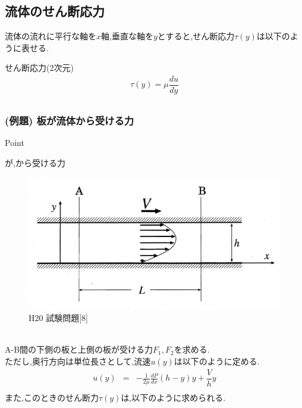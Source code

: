 \documentclass[a4paper]{jsarticle}
\begin{document}
\subsection{流体のせん断応力}
流体の流れに平行な軸を$x$軸,垂直な軸を$y$とすると,せん断応力$\tau\left(y\right)$は以下のように表せる.
\begin{itembox}[l]{せん断応力(2次元)}
    \begin{eqnarray*}
        \tau\left(y\right)=\mu\dfrac{du}{dy}\\
    \end{eqnarray*}
\end{itembox}
\newpage
\subsubsection{(例題) 板が流体から受ける力}
\begin{itembox}[l]{Point}
    \begin{center}
        が,から受ける力
    \end{center}
\end{itembox}
\begin{figure}[htbp]
    \begin{center}
        \includegraphics[width=120mm]{images/ryuriki_image3.jpg}
        \caption{H20 試験問題[8]}
    \end{center}
\end{figure}
\\
A-B間の下側の板と上側の板が受ける力$F_1,F_2$を求める.\\
ただし,奥行方向は単位長さとして,流速$u\left(y\right)$は以下のように定める.
\begin{eqnarray*}
    u\left(y\right)&=&-\frac{1}{2\mu}\frac{dP}{dx}\left(h-y\right)y+\dfrac{V}{h}y\\
\end{eqnarray*}
また,このときのせん断力$\tau \left(y\right)$は,以下のように求められる.
\end{document}
